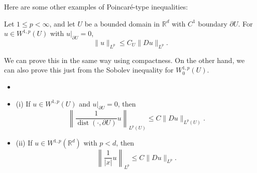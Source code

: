 Here  are  some  other  examples  of  Poincar\'e-type  inequalities:
\begin{theorem}
\label{thm: Friedrich inequality}
Let $1 \leq p<\infty$, and let $U$ be a bounded domain in $\mathbb{R}^{d}$ with $C^{1}$ boundary $\partial U$. For $u \in W^{1, p}(U)$ with $\left.u\right|_{\partial U}=0$,
$$
\|u\|_{L^{p}} \leq C_{U}\|D u\|_{L^{p}} .
$$
\end{theorem}
We can prove this in the same way using compactness. On the other hand, we can also prove this just from the Sobolev inequality for $W_{0}^{1, p}(U)$.

\begin{theorem}
\label{thm: Hardy's inequality}
\begin{itemize}
    \item []
    \item (i) If $u \in W^{1, p}(U)$ and $\left.u\right|_{\partial U}=0$, then
    $$
    \left\|\frac{1}{\operatorname{dist}(\cdot, \partial U)} u\right\|_{L^{p}(U)} \leq C\|D u\|_{L^{p}(U)} .
    $$
    \item (ii) If $u \in W^{1, p}\left(\mathbb{R}^{d}\right)$ with $p<d$, then
    $$
    \left\|\frac{1}{|x|} u\right\|_{L^{p}} \leq C\|D u\|_{L^{p}} .
    $$
\end{itemize}
\end{theorem}
